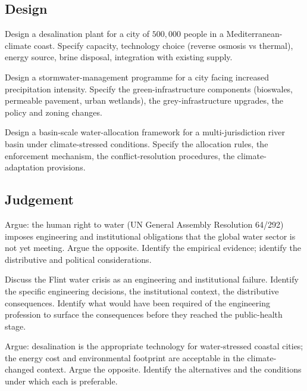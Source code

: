 \subsection*{Design}

\begin{exercise}
Design a desalination plant for a city of $500{,}000$ people in a Mediterranean-climate coast. Specify capacity, technology choice (reverse osmosis vs thermal), energy source, brine disposal, integration with existing supply.
\end{exercise}

\begin{exercise}
Design a stormwater-management programme for a city facing increased precipitation intensity. Specify the green-infrastructure components (bioswales, permeable pavement, urban wetlands), the grey-infrastructure upgrades, the policy and zoning changes.
\end{exercise}

\begin{exercise}
Design a basin-scale water-allocation framework for a multi-jurisdiction river basin under climate-stressed conditions. Specify the allocation rules, the enforcement mechanism, the conflict-resolution procedures, the climate-adaptation provisions.
\end{exercise}

\subsection*{Judgement}

\begin{exercise}
Argue: the human right to water (UN General Assembly Resolution 64/292) imposes engineering and institutional obligations that the global water sector is not yet meeting. Argue the opposite. Identify the empirical evidence; identify the distributive and political considerations.
\end{exercise}

\begin{exercise}
Discuss the Flint water crisis as an engineering and institutional failure. Identify the specific engineering decisions, the institutional context, the distributive consequences. Identify what would have been required of the engineering profession to surface the consequences before they reached the public-health stage.
\end{exercise}

\begin{exercise}
Argue: desalination is the appropriate technology for water-stressed coastal cities; the energy cost and environmental footprint are acceptable in the climate-changed context. Argue the opposite. Identify the alternatives and the conditions under which each is preferable.
\end{exercise}

